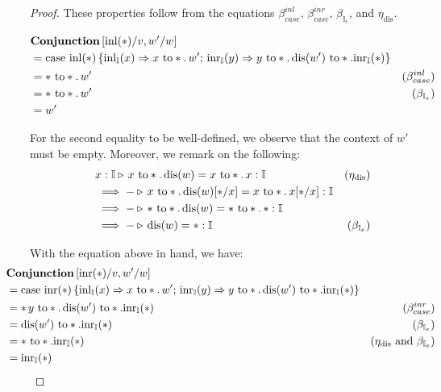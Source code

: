   \begin{proof}
    These properties follow from the equations $\beta_{case}^{inl}$, $\beta_{case}^{inr}$, $\beta_{\mathbb{I}_{e}}$, and $\eta_{\text{dis}}$.

    \begin{equation*}
    \begin{split}
      & \textbf{Conjunction} \, [\mathrm{inl}(*)/v,w'/w ] \\
      & = \text{case } \mathrm{inl}(*)\,
  \{\mathrm{inl}_{\mathbb{I}}(x) \Rightarrow x \text{ to} *. \, w' ;
  \, \mathrm{inr}_{\mathbb{I}}(y) \Rightarrow y \text{ to} *. \,  \text{dis}(w') \text{ to} *. \mathrm{inr}_{\mathbb{I}}(*)
  \} \\
  & = * \text{ to} *. \, w' & (\beta_{case}^{inl}) \\
  & =  * \text{ to} *. \, w' & (\beta_{\mathbb{I}_{e}}) \\
  & = w'
    \end{split}
    \end{equation*}

    For the second equality to be well-defined, we observe that the context of $ w'$ must be empty. Moreover, we remark on the following:
    \begin{align*}
       & x:\mathbb{I} \triangleright \, x \text{ to} *. \, \text{dis}(w) = x \text{ to} *. \, x : \mathbb{I}    & (\eta_{\text{dis}}) \\
       & \implies - \triangleright \,x \text{ to} *. \, \text{dis}(w)[*/x] = x \text{ to} *. \, x  [*/x]  : \mathbb{I} \\
       & \implies - \triangleright \, * \text{ to} *. \, \text{dis}(w) = * \text{ to} *. \, *  : \mathbb{I} \\
       & \implies - \triangleright \,  \text{dis}(w) = * : \mathbb{I} & (\beta_{\mathbb{I}_{e}})
    \end{align*}



    With the equation above in hand, we have:
    \begin{align*}
      & \hspace{-22pt} \textbf{Conjunction} \, [\inr(*)/v,w'/w ] \\
      & \hspace{-22pt}  = \text{case } \inr(*)\,
  \{\inl_{\typeI}(x) \Rightarrow x \text{ to} *. \, w' ;
  \, \inr_{\typeI}(y) \Rightarrow y \text{ to} *. \,  \text{dis}(w') \text{ to} *. \inr_{\typeI}(*)
  \} \\
  & \hspace{-22pt}  =  * \, y \text{ to} *. \,  \text{dis}(w') \text{ to} *. \inr_{\typeI}(*) & (\beta_{case}^{inr}) \\
  & \hspace{-22pt}  = \text{dis}(w') \text{ to} *. \inr_{\typeI}(*) & (\beta_{\mathbb{I}_{e}}) \\
  & \hspace{-22pt}  = * \text{ to} *. \inr_{\typeI}(*) &  (\eta_\text{dis} \text{ and } \beta_{\mathbb{I}_{e}}) \\
  & \hspace{-22pt}  =  \inr_{\typeI}(*)
    \end{align*}
  \end{proof}

